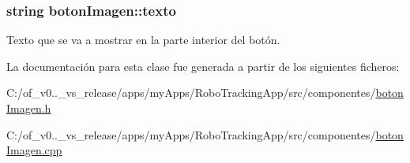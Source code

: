 \subsubsection[{texto}]{\setlength{\rightskip}{0pt plus 5cm}string boton\+Imagen\+::texto\hspace{0.3cm}{\ttfamily [protected]}}\label{classboton_imagen_a7118e57f1d4c1d91f2142b908f109f89}


Texto que se va a mostrar en la parte interior del botón. 



La documentación para esta clase fue generada a partir de los siguientes ficheros\+:\begin{DoxyCompactItemize}
\item 
C\+:/of\+\_\+v0..\+\_\+vs\+\_\+release/apps/my\+Apps/\+Robo\+Tracking\+App/src/componentes/\hyperlink{boton_imagen_8h}{boton\+Imagen.\+h}\item 
C\+:/of\+\_\+v0..\+\_\+vs\+\_\+release/apps/my\+Apps/\+Robo\+Tracking\+App/src/componentes/\hyperlink{boton_imagen_8cpp}{boton\+Imagen.\+cpp}\end{DoxyCompactItemize}
